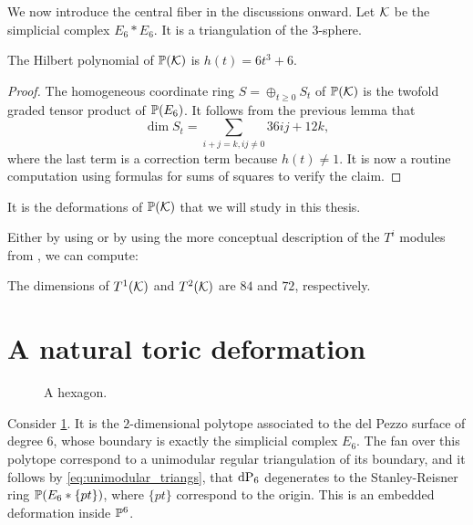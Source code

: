 We now introduce the central fiber in the discussions onward. Let $\K$ be the simplicial complex $E_6 \ast E_6$. It is a triangulation of the $3$-sphere.

\begin{lemma}
The Hilbert polynomial of $\P(\K)$ is $h(t)=6t^3+6$.
\end{lemma}
\begin{proof}
The homogeneous coordinate ring $S=\oplus_{t \geq 0} S_t$ of $\P(\K)$ is the twofold graded tensor product of $\P(E_6)$. It follows from the previous lemma that
\[
\dim S_t = \sum_{i+j=k, ij \neq 0} 36ij + 12k,
\]
where the last term is a correction term because $h(t) \neq 1$. It is now a routine computation using formulas for sums of squares to verify the claim.
\end{proof}

It is the deformations of $\P(\K)$ that we will study in this thesis. 

Either by using \MM or by using the more conceptual description of the $T^i$ modules from \cite{deforming_christophersen}, we can compute: 

\begin{lemma}
The dimensions of $T^1(\K)$ and $T^2(\K)$ are $84$ and $72$, respectively.
\end{lemma}


\section{A natural toric deformation}

\begin{figure}[b]
\centering
{}
\caption{A hexagon.}
\label{fig:hexagon}
\end{figure}

Consider \cref{fig:hexagon}. It is the $2$-dimensional polytope associated to the del Pezzo surface of degree $6$, whose boundary is exactly the simplicial complex $E_6$. The fan over this polytope correspond to a unimodular regular triangulation of its boundary, and it follows by \cref{eq:unimodular_triangs}, that $\dP6$ degenerates to the Stanley-Reisner ring $\P(E_6 \ast \{pt\})$, where $\{ pt \}$ correspond to the origin. This is an embedded deformation inside $\P^6$.

